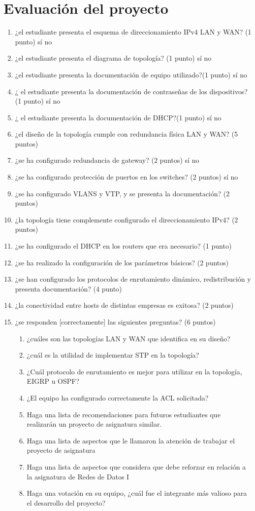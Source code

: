 \documentclass[12pt]{article}
\begin{document}
\section{Evaluación del proyecto}
\begin{enumerate}
\item ¿el estudiante presenta el esquema de direccionamiento IPv4 LAN y WAN? (1 punto)	sí	no
\item ¿el estudiante presenta el diagrama de topología?	(1 punto) sí	no
\item ¿el estudiante presenta la documentación de equipo utilizado?(1 punto)	sí	no
\item ¿ el estudiante presenta la documentación de contraseñas de los dispositivos?(1 punto)	sí	no
\item ¿ el estudiante presenta la documentación de DHCP?(1 punto)	sí	no
\item ¿el diseño de la topología cumple con redundancia física LAN y WAN? (5 puntos)
\item ¿se ha configurado redundancia de gateway? (2 puntos)	sí	no
\item ¿se ha configurado protección de puertos en los switches? (2 puntos)	sí	no
\item ¿se ha configurado VLANS y VTP, y se presenta la documentación? (2 puntos)
\item ¿la topología tiene complemente configurado el direccionamiento IPv4? (2 puntos)
\item ¿se ha configurado el DHCP en los routers que era necesario? (1 punto)
\item ¿se ha realizado la configuración de los parámetros básicos? (2 puntos)
\item ¿se han configurado los protocolos de enrutamiento dinámico, redistribución y presenta documentación? (4 punto)
\item ¿la conectividad entre hosts de distintas empresas es exitosa? (2 puntos)
\item ¿se responden [correctamente] las siguientes preguntas? (6 puntos)
\begin{enumerate}
\item ¿cuáles son las topologías LAN y WAN que identifica en su diseño?
\item ¿cuál es la utilidad de implementar STP en la topología?
\item ¿Cuál protocolo de enrutamiento es mejor para utilizar en la topología, EIGRP u OSPF?
\item ¿El equipo ha configurado correctamente la ACL solicitada?
\item Haga una lista de recomendaciones para futuros estudiantes que realizarán un proyecto de asignatura similar.
\item Haga una lista de aspectos que le llamaron la atención de trabajar el proyecto de asignatura
\item Haga una lista de aspectos que considera que debe reforzar en relación a la asignatura de Redes de Datos I
\item Haga una votación en su equipo, ¿cuál fue el integrante más valioso para el desarrollo del proyecto?
\end{enumerate}
\end{enumerate}
\end{document}
